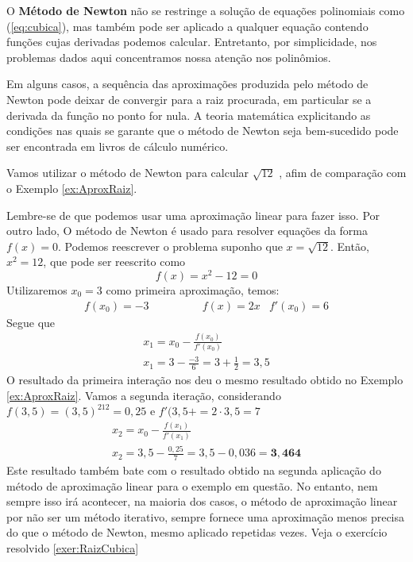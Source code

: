 \cleardoublepage\documentclass[../main.tex]{subfiles}
\begin{document}
O \textbf{Método de Newton} não se restringe a solução de equações polinomiais como (\ref{eq:cubica}), mas também pode ser aplicado a qualquer equação contendo funções cujas derivadas podemos calcular. Entretanto, por simplicidade, nos problemas dados aqui concentramos nossa atenção nos polinômios. 

\begin{obs}
 Em alguns casos, a sequência das aproximações produzida pelo método de Newton pode deixar de convergir para a raiz procurada, em particular se a derivada da função no ponto for nula. A teoria matemática explicitando as condições 
nas quais se garante que o método de Newton seja bem-sucedido pode ser encontrada em livros de cálculo numérico. 
\end{obs}

\begin{exeresol}
Vamos utilizar o método de Newton para calcular $\sqrt{12}$ , afim de comparação com o Exemplo \ref{ex:AproxRaiz}.
\end{exeresol}
\begin{sol}
Lembre-se de que podemos usar uma aproximação linear para fazer isso. Por outro lado,
O método de Newton é usado para resolver equações da forma $f (x) = 0$. Podemos reescrever o
problema suponho que $x = \sqrt{12}$. Então, $x^2 = 12$, que pode ser reescrito como $$f(x)=x^2-12=0$$
Utilizaremos  $x_0=3$ como primeira aproximação, temos:
\begin{align*}
   f(x_0)=-3 &\qquad\qquad f(x)=2x &f'(x_0)=6
\end{align*}
Segue que
\begin{align*}
     x_1=x_0-\frac{f(x_0)}{f'(x_0)}\\
     x_1=3-\frac{-3}{6}=3+\frac{1}{2}=3,5
\end{align*}
O resultado da primeira interação nos deu o mesmo resultado obtido no Exemplo \ref{ex:AproxRaiz}. Vamos a segunda iteração, considerando $f(3,5)=(3,5)^212=0,25$ e $f'(3,5+=2\cdot 3,5=7$
\begin{align*}
     x_2=x_0-\frac{f(x_1)}{f'(x_1)}\\
     x_2=3,5-\frac{0,25}{7}=3,5-0,036=\pmb{3,464}
\end{align*}
Este resultado também bate com o resultado obtido na segunda aplicação do método de aproximação linear para o exemplo em questão. No entanto, nem sempre isso irá acontecer, na maioria dos casos, o método de aproximação linear por não ser um método iterativo, sempre fornece uma aproximação menos precisa do que o método de Newton, mesmo aplicado repetidas vezes. Veja o exercício resolvido \ref{exer:RaizCubica}
\end{sol}
\end{document}
